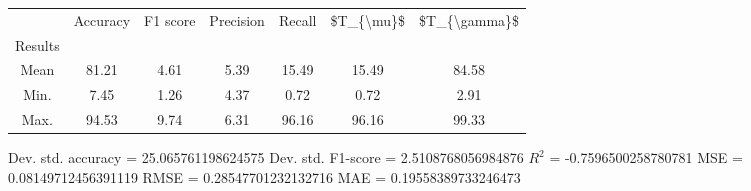 \begin{tabular}{|c|c|c|c|c|c|c|}
\toprule
{} &  Accuracy &  F1 score &  Precision &  Recall &  \$T\_\{\textbackslash mu\}\$ &  \$T\_\{\textbackslash gamma\}\$ \\
Results &           &           &            &         &            &               \\
\hline
Mean    &     81.21 &      4.61 &       5.39 &   15.49 &      15.49 &         84.58 \\
Min.    &      7.45 &      1.26 &       4.37 &    0.72 &       0.72 &          2.91 \\
Max.    &     94.53 &      9.74 &       6.31 &   96.16 &      96.16 &         99.33 \\
\bottomrule
\end{tabular}

 Dev. std. accuracy = 25.065761198624575
 Dev. std. F1-score = 2.5108768056984876
 $R^2$ = -0.7596500258780781
 MSE = 0.08149712456391119
 RMSE = 0.28547701232132716
 MAE = 0.19558389733246473